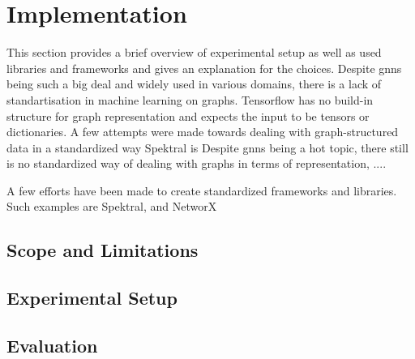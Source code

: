 \chapter{Implementation}
\label{sec:implement}


\label{sec:implement:sec1}
This section provides a brief overview of experimental setup as well as used libraries
and frameworks and gives an explanation for the choices.
Despite \acp{gnn} being such a big deal and widely used in various domains, there
is a lack of standartisation in machine learning on graphs. Tensorflow has no build-in structure for
graph representation and expects the input to be tensors or dictionaries.
A few attempts were made towards dealing with graph-structured data in a standardized way
Spektral is
Despite \acfp{gnn} being a hot topic, there still is no standardized way of dealing with
graphs in terms of representation, ....

A few efforts have been made to create standardized frameworks and libraries.
Such examples are Spektral, and NetworX





\section{Scope and Limitations}


\section{Experimental Setup}
\label{sec:experimental}

\section{Evaluation}
\label{sec:eval}


